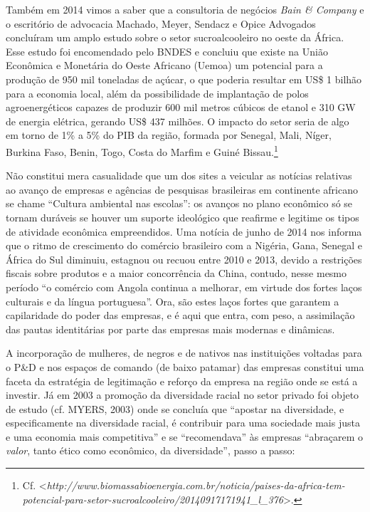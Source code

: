 Também em 2014 vimos a saber que a consultoria de negócios \emph{Bain \&
Company} e o escritório de advocacia Machado, Meyer, Sendacz e Opice
Advogados concluíram um amplo estudo sobre o setor sucroalcooleiro no
oeste da África. Esse estudo foi encomendado pelo BNDES e concluiu que
existe na União Econômica e Monetária do Oeste Africano (Uemoa) um
potencial para a produção de 950 mil toneladas de açúcar, o que poderia
resultar em US\$ 1 bilhão para a economia local, além da possibilidade
de implantação de polos agroenergéticos capazes de produzir 600 mil
metros cúbicos de etanol e 310 GW de energia elétrica, gerando US\$ 437
milhões. O impacto do setor seria de algo em torno de 1\% a 5\% do PIB
da região, formada por Senegal, Mali, Níger, Burkina Faso, Benin, Togo,
Costa do Marfim e Guiné Bissau.\footnote{Cf.
  \textless{}\emph{http://www.biomassabioenergia.com.br/noticia/paises-da-africa-tem-potencial-para-setor-sucroalcooleiro/20140917171941\_l\_376}\textgreater{}.}

Não constitui mera casualidade que um dos sites a veicular as notícias
relativas ao avanço de empresas e agências de pesquisas brasileiras em
continente africano se chame ``Cultura ambiental nas escolas'': os
avanços no plano econômico só se tornam duráveis se houver um suporte
ideológico que reafirme e legitime os tipos de atividade econômica
empreendidos. Uma notícia de junho de 2014 nos informa que o ritmo de
crescimento do comércio brasileiro com a Nigéria, Gana, Senegal e África
do Sul diminuiu, estagnou ou recuou entre 2010 e 2013, devido a
restrições fiscais sobre produtos e a maior concorrência da China,
contudo, nesse mesmo período ``o comércio com Angola continua a
melhorar, em virtude dos fortes laços culturais e da língua
portuguesa''. Ora, são estes laços fortes que garantem a capilaridade do
poder das empresas, e é aqui que entra, com peso, a assimilação das
pautas identitárias por parte das empresas mais modernas e dinâmicas.

A incorporação de mulheres, de negros e de nativos nas instituições
voltadas para o P\&D e nos espaços de comando (de baixo patamar) das
empresas constitui uma faceta da estratégia de legitimação e reforço da
empresa na região onde se está a investir. Já em 2003 a promoção da
diversidade racial no setor privado foi objeto de estudo (cf. MYERS,
2003) onde se concluía que ``apostar na diversidade, e especificamente
na diversidade racial, é contribuir para uma sociedade mais justa e uma
economia mais competitiva'' e se ``recomendava'' às empresas ``abraçarem
o \emph{valor}, tanto ético como econômico, da diversidade'', passo a
passo:

